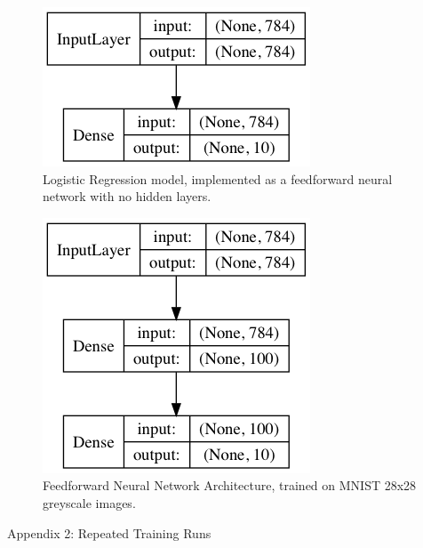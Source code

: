 \documentclass[letterpaper, 10 pt, conference]{ieeeconf}  %
\begin{document}
\begin{figure}[H]
      \centering
      \includegraphics[scale = .3]{logreg_model.png}
		\centering
      \caption{Logistic Regression model, implemented as a feedforward neural network with no hidden layers.}
      \label{figurelabel}
\end{figure}

\begin{figure}[H]
      \centering
      \includegraphics[scale = .3]{ffnn_model.png}
		\centering
      \caption{Feedforward Neural Network Architecture, trained on MNIST 28x28 greyscale images.}
      \label{figurelabel}
\end{figure}

\hrulefill

\large{Appendix 2: Repeated Training Runs}
\end{document}
